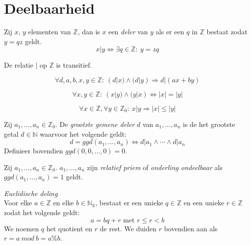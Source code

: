 \documentclass[main.tex]{subfiles}
\begin{document}
\chapter{Deelbaarheid}
\label{cha:deelbaarheid}

\begin{de}
  Zij $x$, $y$ elementen van $\mathbb{Z}$, dan is $x$ een \emph{deler} van $y$ als er een $q$ in $\mathbb{Z}$ bestaat zodat $y = qz$ geldt.
  \[ x | y \Leftrightarrow \exists q \in \mathbb{Z}:\ y= zq \]
\end{de}

\begin{ei}
  De relatie $|$ op $\mathbb{Z}$ is transitief.

\end{ei}

\begin{ei}
  \[ \forall d,a,b,x,y \in \mathbb{Z}:\ (d|x) \wedge (d|y) \Rightarrow d|(ax + by) \]

\end{ei}

\begin{ei}
  \[ \forall x,y \in \mathbb{Z}:\ (x|y) \wedge (y|x) \Leftrightarrow |x| = |y| \]

\end{ei}

\begin{ei}
  \[ \forall x \in \mathbb{Z}, \forall y \in \mathbb{Z}_{0}:\ x|y \Rightarrow |x| \le |y| \]

\end{ei}

\begin{de}
  Zij $a_{1},\dotsc,a_{n} \in \mathbb{Z}_{0}$. De \emph{grootste gemene deler} $d$ van $a_{1},\dotsc,a_{n}$ is de het grootste getal $d \in \mathbb{N}$ waarvoor het volgende geldt:
  \[ d = ggd(a_{1},\dotsc,a_{n}) \Leftrightarrow d|a_{1} \wedge \dotsb \wedge d|a_{n}\]
  Definieer bovendien $ggd(0,0,\dotsc,0) = 0$.   
\end{de}

\begin{de}
  Zij $a_{1},\dotsc,a_{n} \in \mathbb{Z}_{0}$.
  $a_{1},\dotsc,a_{n}$ zijn \emph{relatief priem} of \emph{onderling ondeelbaar} als $ggd(a_{1},\dotsc,a_{n}) = 1$ geldt.
\end{de}

\begin{st}
  \emph{Euclidische deling}\\
  Voor elke $a \in \mathbb{Z}$ en elke $b \in \mathbb{N_{0}}$, bestaat er een unieke $q\in \mathbb{Z}$ en een unieke $r\in \mathbb{Z}$ zodat het volgende geldt:
  \[ a = bq + r \text{ met } r \le r < b \]
  We noemen $q$ het quotient en $r$ de rest.
  We duiden $r$ bovendien aan als $r = a\ mod\ b = a\%b$.

\end{st}
\end{document}
